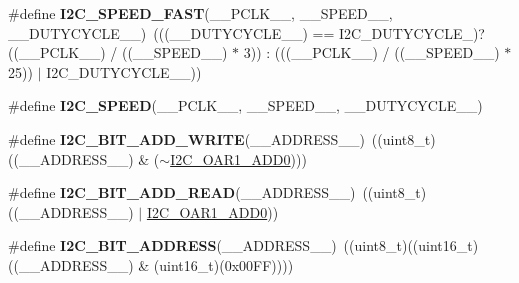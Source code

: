 \begin{DoxyCompactItemize}
\item 
\hypertarget{group___i2_c___private___macro_ga9e5a85344d70ab05020e41ba24566f57}{\#define {\bfseries I2\-C\-\_\-\-S\-P\-E\-E\-D\-\_\-\-F\-A\-S\-T}(\-\_\-\-\_\-\-P\-C\-L\-K\-\_\-\-\_\-, \-\_\-\-\_\-\-S\-P\-E\-E\-D\-\_\-\-\_\-, \-\_\-\-\_\-\-D\-U\-T\-Y\-C\-Y\-C\-L\-E\-\_\-\-\_\-)~(((\-\_\-\-\_\-\-D\-U\-T\-Y\-C\-Y\-C\-L\-E\-\_\-\-\_\-) == I2\-C\-\_\-\-D\-U\-T\-Y\-C\-Y\-C\-L\-E\-\_)? ((\-\_\-\-\_\-\-P\-C\-L\-K\-\_\-\-\_\-) / ((\-\_\-\-\_\-\-S\-P\-E\-E\-D\-\_\-\-\_\-) $\ast$ 3)) \-: (((\-\_\-\-\_\-\-P\-C\-L\-K\-\_\-\-\_\-) / ((\-\_\-\-\_\-\-S\-P\-E\-E\-D\-\_\-\-\_\-) $\ast$ 25)) $\vert$ I2\-C\-\_\-\-D\-U\-T\-Y\-C\-Y\-C\-L\-E\-\_\-\_))}\label{group___i2_c___private___macro_ga9e5a85344d70ab05020e41ba24566f57}

\item 
\#define {\bfseries I2\-C\-\_\-\-S\-P\-E\-E\-D}(\-\_\-\-\_\-\-P\-C\-L\-K\-\_\-\-\_\-, \-\_\-\-\_\-\-S\-P\-E\-E\-D\-\_\-\-\_\-, \-\_\-\-\_\-\-D\-U\-T\-Y\-C\-Y\-C\-L\-E\-\_\-\-\_\-)
\item 
\hypertarget{group___i2_c___private___macro_gad83949bd18eca67258b05763a90d0128}{\#define {\bfseries I2\-C\-\_\-B\-I\-T\-\_\-\-A\-D\-D\-\_\-\-W\-R\-I\-T\-E}(\-\_\-\-\_\-\-A\-D\-D\-R\-E\-S\-S\-\_\-\-\_\-)~((uint8\-\_\-t)((\-\_\-\-\_\-\-A\-D\-D\-R\-E\-S\-S\-\_\-\-\_\-) \& ($\sim$\hyperlink{group___peripheral___registers___bits___definition_ga8b7c20c81f79d17921718412b8fca6d7}{I2\-C\-\_\-\-O\-A\-R1\-\_\-\-A\-D\-D0})))}\label{group___i2_c___private___macro_gad83949bd18eca67258b05763a90d0128}

\item 
\hypertarget{group___i2_c___private___macro_gacec6f0d6fde48a24327d2db15387fed8}{\#define {\bfseries I2\-C\-\_\-B\-I\-T\-\_\-\-A\-D\-D\-\_\-\-R\-E\-A\-D}(\-\_\-\-\_\-\-A\-D\-D\-R\-E\-S\-S\-\_\-\-\_\-)~((uint8\-\_\-t)((\-\_\-\-\_\-\-A\-D\-D\-R\-E\-S\-S\-\_\-\-\_\-) $\vert$ \hyperlink{group___peripheral___registers___bits___definition_ga8b7c20c81f79d17921718412b8fca6d7}{I2\-C\-\_\-\-O\-A\-R1\-\_\-\-A\-D\-D0}))}\label{group___i2_c___private___macro_gacec6f0d6fde48a24327d2db15387fed8}

\item 
\hypertarget{group___i2_c___private___macro_ga51ad2b93ef13577d3d437507e09191cd}{\#define {\bfseries I2\-C\-\_\-B\-I\-T\-\_\-\-A\-D\-D\-R\-E\-S\-S}(\-\_\-\-\_\-\-A\-D\-D\-R\-E\-S\-S\-\_\-\-\_\-)~((uint8\-\_\-t)((uint16\-\_\-t)((\-\_\-\-\_\-\-A\-D\-D\-R\-E\-S\-S\-\_\-\-\_\-) \& (uint16\-\_\-t)(0x00\-F\-F))))}\label{group___i2_c___private___macro_ga51ad2b93ef13577d3d437507e09191cd}


\end{DoxyCompactItemize}
